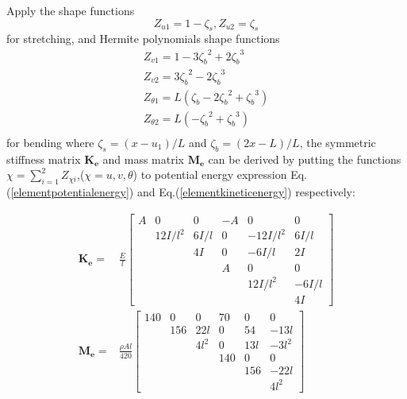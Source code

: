 \documentclass[conference, onecolumn]{IEEEtran}
\begin{document}
Apply the shape functions 
\begin{equation}
	Z_{u1}=1-\zeta_s, Z_{u2}=\zeta_s
	\label{shapefunctionu}
\end{equation} 
for stretching, and Hermite polynomials shape functions
\begin{equation}	
	\begin{array}{l}
		Z_{v1}=1-3{\zeta_b}^2+2{\zeta_b}^3\\
		Z_{v2}=3{\zeta_b}^2-2{\zeta_b}^3\\
		Z_{\theta1}=L(\zeta_b-2{\zeta_b}^2+{\zeta_b}^3)\\
		Z_{\theta2}=L(-{\zeta_b}^2+{\zeta_b}^3)\\
	\end{array}
	\label{shapefunctionv}
\end{equation}
for bending where $\zeta_s = (x-u_1)/L$ and ${\zeta_b}=(2x-{L})/L $, the symmetric stiffness matrix $\mathbf{K_e}$ and mass matrix $\mathbf{M_e}$ can be derived by putting the functions $\chi =\sum_{i = 1}^{2}{Z_{\chi i}} $,($\chi=u,v,\theta$) to potential energy expression Eq.(\ref{elementpotentialenergy}) and Eq.(\ref{elementkineticenergy}) respectively:


\begin{subequations}
	\begin{align}
	\mathbf{K_e}=&\frac{E}{l}
	\begin{bmatrix}
		A & 0 & 0 & -A & 0 &0  \\
		& 12I/ \!l^2 & 6I/ \!l & 0 & -12I/ \!l^2 & 6I/ \!l \\
		& & 4I & 0 & -6I/ \!l & 2I \\
		& & & A & 0 & 0 \\
		& & & & 12I/ \!l^2 & -6I/ \!l\\
		& & & & & 4I		
	\end{bmatrix} \\ 
	\mathbf{M_e} =& \frac{\rho A l}{420}
	\begin{bmatrix}
		140 & 0 & 0 & 70 & 0 &0  \\
		& 156 & 22l & 0 & 54 & -13l \\
		& & 4l^2 & 0 & 13l & -3l^2 \\
		& & & 140 & 0 & 0 \\
		& & & & 156 & -22l\\
		& & & & & 4l^2		
	\end{bmatrix}
	\end{align}
\label{matrixofelement}
\end{subequations}
\end{document}
